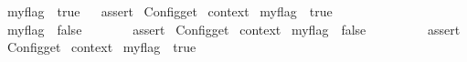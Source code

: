 \begin{isabellebody}
\endisatagML
{\isafoldML}%
%
\isadelimML
%
\endisadelimML
\isanewline
\isanewline
{}\isamarkupfalse%
\ {}{}my{}flag\ {}\ true{}{}\isanewline
%
\isadelimML
\isanewline
%
\endisadelimML
%
\isatagML
{}\isamarkupfalse%
\ {}\ %
\isaantiq
assert{}%
\endisaantiq
\ {}Config{}get\ %
\isaantiq
context{}%
\endisaantiq
\ my{}flag\ {}\ true{}\ {}%
\endisatagML
{\isafoldML}%
%
\isadelimML
\isanewline
%
\endisadelimML
\isanewline
{}\isamarkupfalse%
\isanewline
{}\isanewline
%
\isadelimproof
\ \ %
\endisadelimproof
%
\isatagproof
{}\isamarkupfalse%
\isanewline
\ \ \ \ \isamarkupfalse%
\ {}{}my{}flag\ {}\ false{}{}%
\endisatagproof
{\isafoldproof}%
%
\isadelimproof
\isanewline
%
\endisadelimproof
%
\isadelimML
\ \ \ \ %
\endisadelimML
%
\isatagML
{}\isamarkupfalse%
\ {}\ %
\isaantiq
assert{}%
\endisaantiq
\ {}Config{}get\ %
\isaantiq
context{}%
\endisaantiq
\ my{}flag\ {}\ false{}\ {}%
\endisatagML
{\isafoldML}%
%
\isadelimML
\isanewline
%
\endisadelimML
%
\isadelimproof
\ \ %
\endisadelimproof
%
\isatagproof
{}\isamarkupfalse%
%
\endisatagproof
{\isafoldproof}%
%
\isadelimproof
\isanewline
%
\endisadelimproof
%
\isadelimML
\ \ %
\endisadelimML
%
\isatagML
{}\isamarkupfalse%
\ {}\ %
\isaantiq
assert{}%
\endisaantiq
\ {}Config{}get\ %
\isaantiq
context{}%
\endisaantiq
\ my{}flag\ {}\ true{}\ {}%

\end{isabellebody}
